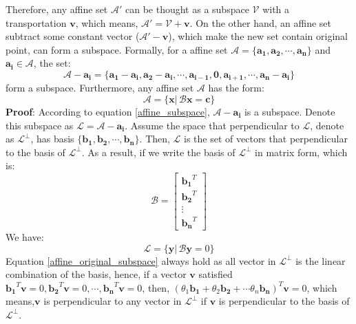 \documentclass[10pt,a4paper]{article}
\begin{document}
Therefore, any affine set $\mathcal{A}'$ can be thought as a subspace $\mathcal{V}$ with a transportation $\mathbf{v}$, which means, $\mathcal{A}' = \mathcal{V} + \mathbf{v}$. On the other hand, an affine set subtract some constant vector ($\mathcal{A}' - \mathbf{v}$), which make the new set contain original point, can form a subspace. Formally, for a affine set $\mathcal{A} = \{ \mathbf{a_{1}}, \mathbf{a_{2}}, \cdots, \mathbf{a_{n}} \}$ and  $\mathbf{a_{i}} \in \mathcal{A}$, the set:
\begin{equation}
	\mathcal{A} - \mathbf{a_{i}} = \{ \mathbf{a_{1}} - \mathbf{a_{i}}, \mathbf{a_{2}} - \mathbf{a_{i}}, \cdots,  \mathbf{a_{i - 1}}, \mathbf{0}, \mathbf{a_{i + 1}}, \cdots, \mathbf{a_{n}} - \mathbf{a_{i}} \}
	\label{affine_subspace}
\end{equation}
form a subspace. Furthermore, any affine set $\mathcal{A}$ has the form:
\begin{equation}
	\mathcal{A} = \{ \mathbf{x} |\, \mathcal{B} \mathbf{x} = \mathbf{c} \}
	\label{affine_matrix}
\end{equation}
\textbf{Proof}: According to equation \ref{affine_subspace}, $\mathcal{A} - \mathbf{a_{i}}$ is a subspace. Denote this subspace as $\mathcal{L} = \mathcal{A} - \mathbf{a_{i}}$. Assume the space that perpendicular to $\mathcal{L}$, denote as $\mathcal{L}^{\perp}$, has basis $\{ \mathbf{b_{1}}, \mathbf{b_{2}}, \cdots, \mathbf{b_{n}} \}$. Then, $\mathcal{L}$ is the set of vectors that perpendicular to the basis of $\mathcal{L}^{\perp}$. As a result, if we write the basis of $\mathcal{L}^{\perp}$ in matrix form, which is:
\begin{equation*}
	\mathcal{B} = 
	\begin{bmatrix}
		\mathbf{b_{1}}^{T} \\
		\mathbf{b_{2}}^{T} \\
		\vdots \\
		\mathbf{b_{n}}^{T}
	\end{bmatrix}
\end{equation*}
We have:
\begin{equation}
	\mathcal{L} = \{ \mathbf{y} |\, \mathcal{B} \mathbf{y} = 0 \}
	\label{affine_original_subspace}
\end{equation} 
Equation \ref{affine_original_subspace} always hold as all vector in $\mathcal{L}^{\perp}$ is the linear combination of the basis, hence, if a vector $\mathbf{v}$ satisfied $\mathbf{b_{1}}^{T} \mathbf{v} = 0, \mathbf{b_{2}}^{T} \mathbf{v} = 0, \cdots, \mathbf{b_{n}}^{T} \mathbf{v} = 0$, then, $(\theta_{1} \mathbf{b_{1}} + \theta_{2} \mathbf{b_{2}} + \cdots \theta_{n} \mathbf{b_{n}})^{T} \mathbf{v} = 0$, which means,$\mathbf{v}$ is perpendicular to any vector in $\mathcal{L}^{\perp}$ if $\mathbf{v}$ is perpendicular to the basis of $\mathcal{L}^{\perp}$.
\end{document}
